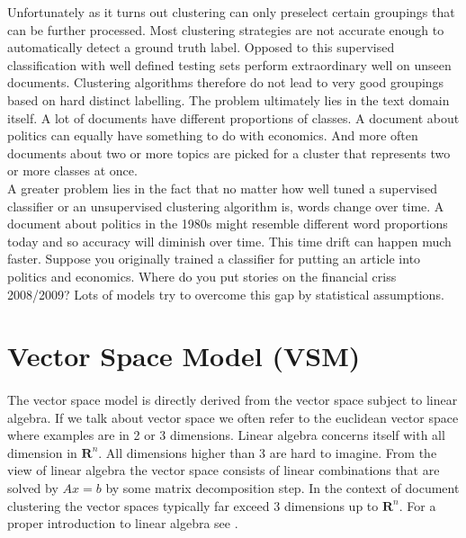     Unfortunately as it turns out clustering can only preselect certain groupings that can be further processed. Most clustering strategies are not accurate enough to automatically detect a ground truth label. Opposed to this supervised classification with well defined testing sets perform extraordinary well on unseen documents. Clustering algorithms therefore do not lead to very good groupings based on hard distinct labelling. The problem ultimately lies in the text domain itself. A lot of documents have different proportions of classes. A document about politics can equally have something to do with economics. And more often documents about two or more topics are picked for a cluster that represents two or more classes at once.\\
    A greater problem lies in the fact that no matter how well tuned a supervised classifier or an unsupervised clustering algorithm is, words change over time. A document about politics in the 1980s might resemble different word proportions today and so accuracy will diminish over time. This time drift can happen much faster. Suppose you originally trained a classifier for putting an article into politics and economics. Where do you put stories on the financial criss 2008/2009? Lots of models try to overcome this gap by statistical assumptions.

\newpage{}
\section{Vector Space Model (VSM)}
  
  \paragraph{}
    The vector space model is directly derived from the vector space subject to linear algebra. If we talk about vector space we often refer to the euclidean vector space where examples are in 2 or 3 dimensions. Linear algebra concerns itself with all dimension in $\mathbf{R}^{n}$. All dimensions higher than 3 are hard to imagine. From the view of linear algebra the vector space consists of linear combinations that are solved by $Ax = b$ by some matrix decomposition step. In the context of document clustering the vector spaces typically far exceed 3 dimensions up to $\mathbf{R}^{n}$. For a proper introduction to linear algebra see \cite{Strang2009}.

